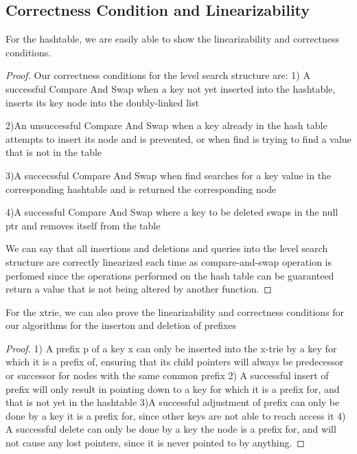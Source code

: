 \documentclass[10pt,twocolumn]{article}
\begin{document}
\subsection{Correctness Condition and Linearizability}
For the hashtable, we are easily able to show the linearizability and correctness conditions.\\
\begin{proof}
Our correctness conditions for the level search structure are: 
1) A successful Compare And Swap when a key not yet inserted into the hashtable, inserts its key node into the doubly-linked list

2)An unsuccessful Compare And Swap when a key already in the hash table attempts to insert its node and is prevented, or when find is trying to find a value that is not in the table

3)A succecssful Compare And Swap when find searches for a key value in the corresponding hashtable and is returned the corresponding node

4)A successful Compare And Swap where a key to be deleted swaps in the null ptr and removes itself from the table

We can say that all insertions and deletions and queries into the level search structure are correctly linearized each time as compare-and-swap operation is perfomed since the operations performed on the hash table can be guaranteed return a value that is not being altered by another function.
\end{proof}
For the xtrie, we can also prove the linearizability and correctness conditions for our algorithms for the inserton and deletion of prefixes 
\begin{proof}
1) A prefix p of a key x can only be inserted into the x-trie by a key for which it is a prefix of, ensuring that its child pointers will always be predecessor or successor for nodes with the same common prefix
2) A successful insert of prefix will only result in pointing down to a key for which it is a prefix for, and that is not yet in the hashtable
3)A successful adjustment of prefix can only be done by a key it is a prefix for, since other keys are not able to reach access it
4) A successful delete can only be done by a key the node is a prefix for, and will not cause any lost pointers, since it is never pointed to by anything.
\end{proof} 
\end{document}
